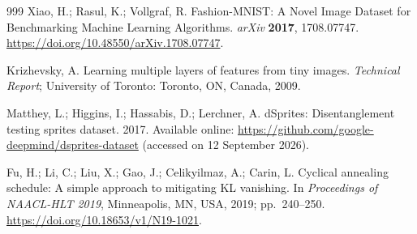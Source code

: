 \documentclass[11pt,a4paper]{ltjsarticle}
\begin{document}
\begin{thebibliography}{999}
Xiao, H.; Rasul, K.; Vollgraf, R.
Fashion-{MNIST}: A Novel Image Dataset for Benchmarking Machine Learning
Algorithms.
\textit{arXiv} \textbf{2017}, 1708.07747. \url{https://doi.org/10.48550/arXiv.1708.07747}.

Krizhevsky, A.
Learning multiple layers of features from tiny images.
\textit{Technical Report}; University of Toronto: Toronto, ON, Canada,
2009.

Matthey, L.; Higgins, I.; Hassabis, D.; Lerchner, A.
dSprites: Disentanglement testing sprites dataset. 2017.
Available online: \url{https://github.com/google-deepmind/dsprites-dataset}
(accessed on 12 September 2026).

Fu, H.; Li, C.; Liu, X.; Gao, J.; Celikyilmaz, A.; Carin, L.
Cyclical annealing schedule: A simple approach to mitigating KL vanishing.
In \textit{Proceedings of NAACL-HLT 2019}, Minneapolis, MN, USA, 2019;
pp.~240--250. \url{https://doi.org/10.18653/v1/N19-1021}.

\end{thebibliography}
\end{document}
